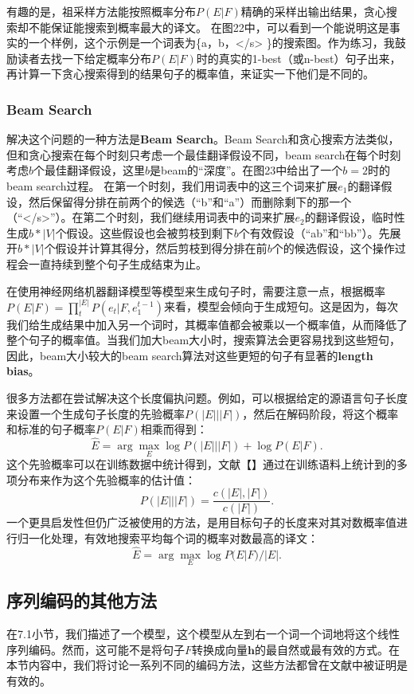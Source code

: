 \documentclass[10pt,a4paper]{ctexart}
\begin{document}
有趣的是，祖采样方法能按照概率分布$P(E|F)$精确的采样出输出结果，贪心搜索却不能保证能搜索到概率最大的译文。
在图22中，可以看到一个能说明这是事实的一个样例，这个示例是一个词表为\{a，b，</s> \}的搜索图。作为练习，我鼓励读者去找一下给定概率分布$P(E|F)$时的真实的1-best（或n-best）句子出来，再计算一下贪心搜索得到的结果句子的概率值，来证实一下他们是不同的。

\subsubsection{Beam Search}
解决这个问题的一种方法是\textbf{Beam Search}。Beam Search和贪心搜索方法类似，但和贪心搜索在每个时刻只考虑一个最佳翻译假设不同，beam search在每个时刻考虑$b$个最佳翻译假设，这里$b$是beam的“深度”。在图23中给出了一个$b=2$时的beam search过程。
在第一个时刻，我们用词表中的这三个词来扩展$e_1$的翻译假设，然后保留得分排在前两个的候选（“b”和“a”）而删除剩下的那一个（“</s>”）。在第二个时刻，我们继续用词表中的词来扩展$e_2$的翻译假设，临时性生成$b * |V|$个假设。这些假设也会被剪枝到剩下$b$个有效假设（“ab”和“bb”）。先展开$b * |V|$个假设并计算其得分，然后剪枝到得分排在前$b$个的候选假设，这个操作过程会一直持续到整个句子生成结束为止。

在使用神经网络机器翻译模型等模型来生成句子时，需要注意一点，根据概率$P(E|F) = \prod_t^{|E|}P(e_t | F,e_1^{t-1})$来看，模型会倾向于生成短句。这是因为，每次我们给生成结果中加入另一个词时，其概率值都会被乘以一个概率值，从而降低了整个句子的概率值。当我们加大beam大小时，搜索算法会更容易找到这些短句，因此，beam大小较大的beam search算法对这些更短的句子有显著的\textbf{length bias}。

很多方法都在尝试解决这个长度偏执问题。例如，可以根据给定的源语言句子长度来设置一个生成句子长度的先验概率$P(|E| | |F|)$，然后在解码阶段，将这个概率和标准的句子概率$P(E | F)$相乘而得到：
\[
 \hat{E} = \arg \max \limits_{E} \log P(|E|||F|) + \log P(E|F).
\]
这个先验概率可以在训练数据中统计得到，文献【】通过在训练语料上统计到的多项分布来作为这个先验概率的估计值：
\[
 P(|E|||F|) = \frac{c(|E|,|F|)}{c(|F|)}.
\]
一个更具启发性但仍广泛被使用的方法，是用目标句子的长度来对其对数概率值进行归一化处理，有效地搜索平均每个词的概率对数最高的译文：
\[
 \hat{E} = \arg \max \limits_{E} \log P(E|F)/|E|.
\]

\subsection{序列编码的其他方法}
在7.1小节，我们描述了一个模型，这个模型从左到右一个词一个词地将这个线性序列编码。然而，这可能不是将句子$F$转换成向量$\textbf{h}$的最自然或最有效的方式。在本节内容中，我们将讨论一系列不同的编码方法，这些方法都曾在文献中被证明是有效的。
\end{document}
